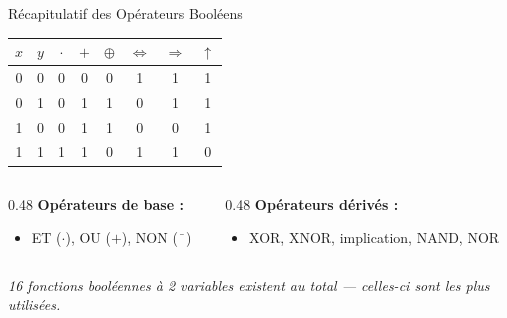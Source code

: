 \begin{frame}{Récapitulatif des Opérateurs Booléens}

    \centering
    \small
    \begin{tabular}{|c|c||c|c|c|c|c|c|}
        \hline
        \(x\) & \(y\) & \(\cdot\) & \(+\) & \(\oplus\) & \(\Leftrightarrow\) & \(\Rightarrow\) & \(\uparrow\) \\
        \hline
        0 & 0 & 0 & 0 & 0 & 1 & 1 & 1 \\
        0 & 1 & 0 & 1 & 1 & 0 & 1 & 1 \\
        1 & 0 & 0 & 1 & 1 & 0 & 0 & 1 \\
        1 & 1 & 1 & 1 & 0 & 1 & 1 & 0 \\
        \hline
    \end{tabular}

    \vspace{0.5cm}

    \begin{columns}[T]
        \begin{column}{0.48\textwidth}
            \textbf{Opérateurs de base :}
            \begin{itemize}
                \item ET (\(\cdot\)), OU (\(+\)), NON (\(\bar{\phantom{x}}\))
            \end{itemize}
        \end{column}
        \begin{column}{0.48\textwidth}
            \textbf{Opérateurs dérivés :}
            \begin{itemize}
                \item XOR, XNOR, implication, NAND, NOR
            \end{itemize}
        \end{column}
    \end{columns}

    \vspace{0.3cm}
    \centering
    \textit{16 fonctions booléennes à 2 variables existent au total — celles-ci sont les plus utilisées.}

\end{frame}




